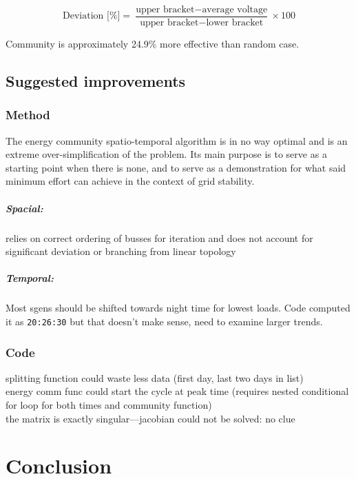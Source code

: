\documentclass[a4paper,10pt]{report}
\begin{document}
\begin{equation}
	\text{Deviation [\%]} = \frac{\text{upper bracket} - \text{average voltage}}{\text{upper bracket}-\text{lower bracket}}\times 100
\end{equation}

Community is approximately 24.9\% more effective than random case.

\section{Suggested improvements}
\subsection{Method}
The energy community spatio-temporal algorithm is in no way optimal and is an extreme over-simplification of the problem. Its main purpose is to serve as a starting point when there is none, and to serve as a demonstration for what said minimum effort can achieve in the context of grid stability.\\

\paragraph{Spacial:} relies on correct ordering of busses for iteration and does not account for significant deviation or branching from linear topology\\

\paragraph{Temporal:} Most sgens should be shifted towards night time for lowest loads. Code computed it as \texttt{20:26:30} but that doesn't make sense, need to examine larger trends.


\subsection{Code}
splitting function could waste less data (first day, last two days in list)\\
energy comm func could start the cycle at peak time (requires nested conditional for loop for both times and community function)\\
the matrix is exactly singular---jacobian could not be solved: no clue\\



\chapter{Conclusion}

\end{document}
